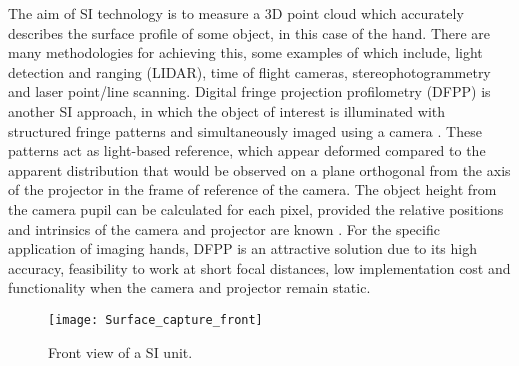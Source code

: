 \documentclass[twoside]{bhamthesis}
\theoremstyle{definition}
\begin{document}
The aim of SI technology is to measure a 3D point cloud which accurately describes the surface profile of some object, in this case of the hand. There are many methodologies for achieving this, some examples of which include, light detection and ranging (LIDAR), time of flight cameras, stereophotogrammetry and laser point/line scanning. Digital fringe projection profilometry (DFPP) is another SI approach, in which the object of interest is illuminated with structured fringe patterns and simultaneously imaged using a camera \cite{geng2011structured}. These patterns act as light-based reference, which appear deformed compared to the apparent distribution that would be observed on a plane orthogonal from the axis of the projector in the frame of reference of the camera. The object height from the camera pupil can be calculated for each pixel, provided the relative positions and intrinsics of the camera and projector are known \cite{srinivasan1984automated}. For the specific application of imaging hands, DFPP is an attractive solution due to its high accuracy, feasibility to work at short focal distances, low implementation cost and functionality when the camera and projector remain static.


\begin{figure}[!ht]
\centering
  \texttt{[image: Surface\_capture\_front]}
\caption{Front view of a SI unit.}
  \label{fig:surface_capture_front}

\end{figure} 
\end{document}
